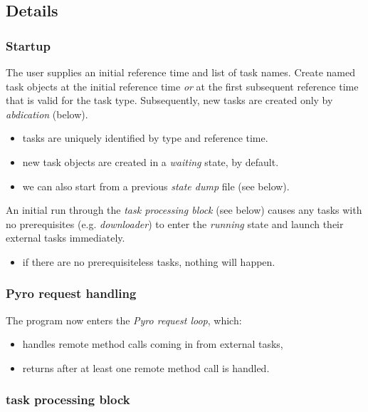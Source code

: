 \documentclass[a4paper,12pt]{amsart}
\begin{document}
\subsection{Details}

\subsubsection{Startup}

The user supplies an initial reference time and list of task names.
Create named task objects at the initial reference time {\em or} at the
first subsequent reference time that is valid for the task type.
Subsequently, new tasks are created only by {\em abdication} (below).
    \begin{itemize}
        \item tasks are uniquely identified by type and reference time. 
        \item new task objects are created in a {\em waiting} state, by
        default.
        \item we can also start from a previous {\em state dump} file
        (see below).
    \end{itemize}


An initial run through the {\em task processing block} (see below)
causes any tasks with no prerequisites (e.g. {\em downloader}) to enter the
{\em running} state and launch their external tasks immediately.
    \begin{itemize}
    \item if there are no prerequisiteless tasks, nothing will happen.
    \end{itemize}

\subsubsection{Pyro request handling}

The program now enters the {\em Pyro request loop}, which:

    \begin{itemize}
    \item handles remote method calls coming in from external tasks, 
    \item returns after at least one remote method call is handled. 
    \end{itemize}

\subsubsection{task processing block} 
\end{document}
